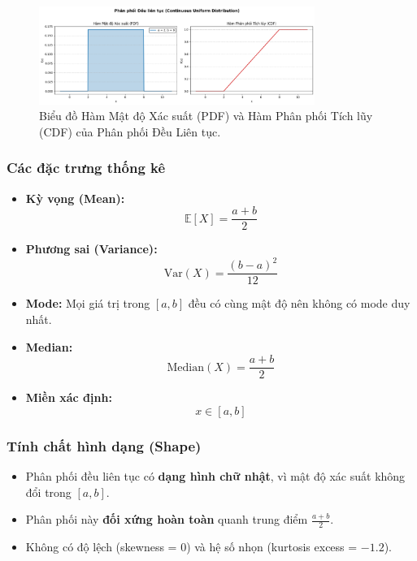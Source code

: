   
\begin{figure}[h!]
    \centering
    \includegraphics[width=0.8\textwidth]{images/Uniform_PDF_and_CDF.png}
    \caption{Biểu đồ Hàm Mật độ Xác suất (PDF) và Hàm Phân phối Tích lũy (CDF) của Phân phối Đều Liên tục.}
    \label{fig:uniform_cont_dist}
\end{figure}

\subsubsection{Các đặc trưng thống kê}

\begin{itemize}
    \item \textbf{Kỳ vọng (Mean):}
    \[
    \mathbb{E}[X] = \frac{a + b}{2}
    \]
    \item \textbf{Phương sai (Variance):}
    \[
    \mathrm{Var}(X) = \frac{(b - a)^2}{12}
    \]
    \item \textbf{Mode:} Mọi giá trị trong $[a, b]$ đều có cùng mật độ nên không có mode duy nhất.
    \item \textbf{Median:}
    \[
    \mathrm{Median}(X) = \frac{a + b}{2}
    \]
    \item \textbf{Miền xác định:}
    \[
    x \in [a, b]
    \]
\end{itemize}

\subsubsection{Tính chất hình dạng (Shape)}

\begin{itemize}
    \item Phân phối đều liên tục có \textbf{dạng hình chữ nhật}, vì mật độ xác suất không đổi trong $[a, b]$.
    \item Phân phối này \textbf{đối xứng hoàn toàn} quanh trung điểm $\frac{a + b}{2}$.
    \item Không có độ lệch (skewness = 0) và hệ số nhọn (kurtosis excess = $-1.2$).
\end{itemize}


